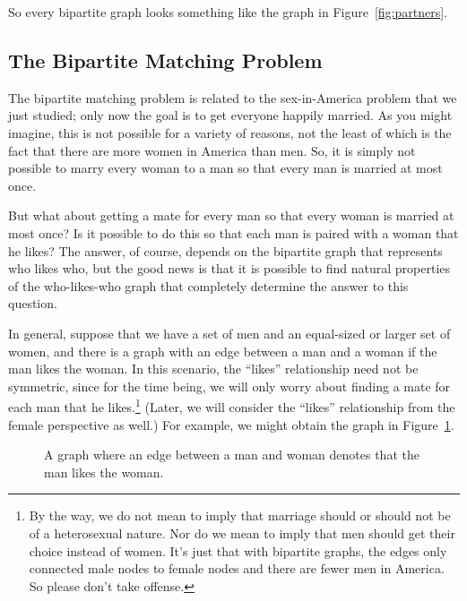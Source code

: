 \begin{editingnotes}
\end{editingnotes}

So every bipartite graph looks something like the graph in
Figure~\ref{fig:partners}.

\subsection{The Bipartite Matching Problem}

The bipartite matching problem is related to the sex-in-America
problem that we just studied; only now the goal is to get everyone
happily married.  As you might imagine, this is not possible for a
variety of reasons, not the least of which is the fact that there are
more women in America than men.  So, it is simply not possible to
marry every woman to a man so that every man is married at most once.

But what about getting a mate for every man so that every woman is married
at most once?  Is it possible to do this so that each man is paired with a
woman that he likes?  The answer, of course, depends on the bipartite graph
that represents who likes who, but the good news is that it is possible to
find natural properties of the who-likes-who graph that completely
determine the answer to this question.

In general, suppose that we have a set of men and an equal-sized or
larger set of women, and there is a graph with an edge between a man
and a woman if the man likes the woman.  In this scenario,
the ``likes'' relationship need not be symmetric, since for the time
being, we will only worry about finding a mate for each man that he
likes.\footnote{By the way, we do not mean to imply that marriage
  should or should not be of a heterosexual nature.  Nor do we mean to
  imply that men should get their choice instead of women.  It's just
  that with bipartite graphs, the edges only connected male nodes to
  female nodes and there are fewer men in America.  So please don't
  take offense.}  (Later, we will consider the ``likes'' relationship
from the female perspective as well.)  For example, we might obtain
the graph in Figure~\ref{fig:5J}.

\begin{figure}



\caption{A graph where an edge between a man and woman denotes that
  the man likes the woman.}

\label{fig:5J}

\end{figure}

